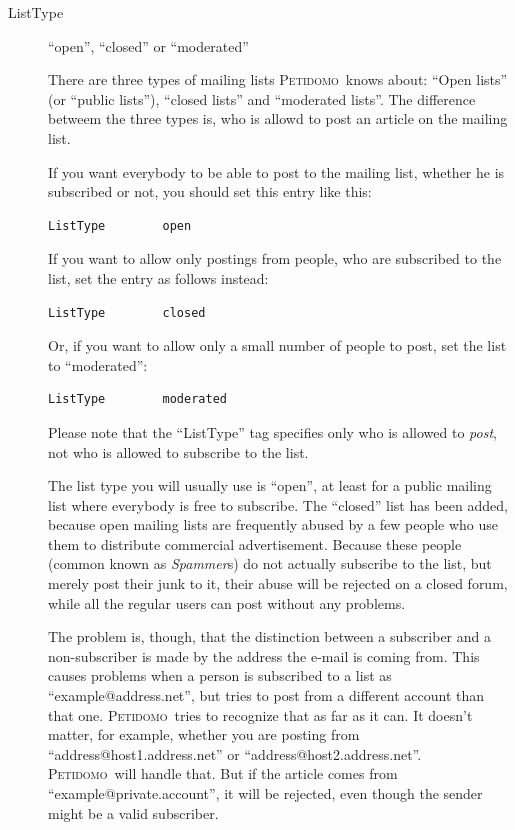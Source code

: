 \documentclass[a4paper,10pt]{scrreprt}
\newcommand{\Petidomo}{{\scshape Peti\-domo}}
\newcommand{\Def}[1]{{\sl #1}}
\begin{document}
\begin{description}

\item[ListType] \hfill ``open'', ``closed'' or ``moderated''

There are three types of mailing lists \Petidomo\ knows about: ``Open
lists'' (or ``public lists''), ``closed lists'' and ``moderated
lists''. The difference betweem the three types is, who is allowd to
post an article on the mailing list.

If you want everybody to be able to post to the mailing list, whether
he is subscribed or not, you should set this entry like this:
\begin{verbatim}
ListType        open
\end{verbatim}

If you want to allow only postings from people, who are subscribed to
the list, set the entry as follows instead:
\begin{verbatim}
ListType        closed
\end{verbatim}

Or, if you want to allow only a small number of people to post, set
the list to ``moderated'':
\begin{verbatim}
ListType        moderated
\end{verbatim}

Please note that the ``ListType'' tag specifies only who is allowed to
\emph{post}, not who is allowed to subscribe to the list.

The list type you will usually use is ``open'', at least for a public
mailing list where everybody is free to subscribe. The ``closed'' list
has been added, because open mailing lists are frequently abused by a
few people who use them to distribute commercial advertisement.
Because these people (common known as \Def{Spammer}s) do not actually
subscribe to the list, but merely post their junk to it, their abuse
will be rejected on a closed forum, while all the regular users can
post without any problems.

The problem is, though, that the distinction between a subscriber and
a non-subscriber is made by the address the e-mail is coming from.
This causes problems when a person is subscribed to a list as
``example@address.net'', but tries to post from a different account
than that one. \Petidomo\ tries to recognize that as far as it can.
It doesn't matter, for example, whether you are posting from
``address@host1.address.net'' or ``address@host2.address.net''.
\Petidomo\ will handle that. But if the article comes from
``example@private.account'', it will be rejected, even though the
sender might be a valid subscriber.


\end{description}
\end{document}
